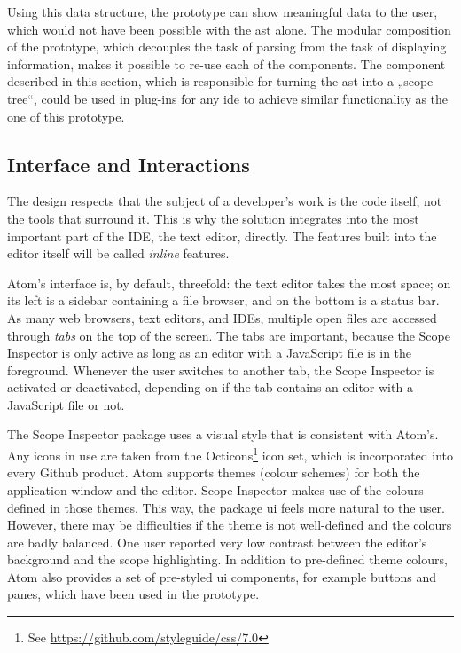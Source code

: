 Using this data structure, the prototype can show meaningful data to the
user, which would not have been possible with the \ac{ast} alone. The
modular composition of the prototype, which decouples the task of
parsing from the task of displaying information, makes it possible to
re-use each of the components. The component described in this section,
which is responsible for turning the \ac{ast} into a „scope tree“, could
be used in plug-ins for any \ac{ide} to achieve similar functionality as
the one of this prototype.

\subsection{Interface and
Interactions}\label{interface-and-interactions}

The design respects that the subject of a developer’s work is the code
itself, not the tools that surround it. This is why the solution
integrates into the most important part of the IDE, the text editor,
directly. The features built into the editor itself will be called
\emph{inline} features.

Atom’s interface is, by default, threefold: the text editor takes the
most space; on its left is a sidebar containing a file browser, and on
the bottom is a status bar. As many web browsers, text editors, and
IDEs, multiple open files are accessed through \emph{tabs} on the top of
the screen. The tabs are important, because the Scope Inspector is only
active as long as an editor with a JavaScript file is in the foreground.
Whenever the user switches to another tab, the Scope Inspector is
activated or deactivated, depending on if the tab contains an editor
with a JavaScript file or not.

The Scope Inspector package uses a visual style that is consistent with
Atom’s. Any icons in use are taken from the
Octicons\footnote{See \url{https://github.com/styleguide/css/7.0}} icon
set, which is incorporated into every Github product. Atom supports
themes (colour schemes) for both the application window and the editor.
Scope Inspector makes use of the colours defined in those themes. This
way, the package \ac{ui} feels more natural to the user. However, there
may be difficulties if the theme is not well-defined and the colours are
badly balanced. One user reported very low contrast between the editor’s
background and the scope highlighting. In addition to pre-defined theme
colours, Atom also provides a set of pre-styled \ac{ui} components, for
example buttons and panes, which have been used in the prototype.

